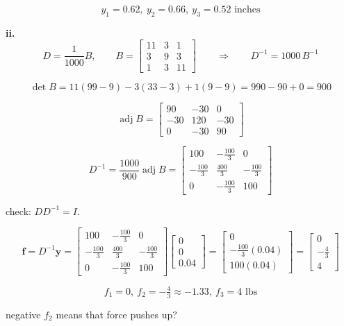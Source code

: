 \documentclass{article}
\begin{document}
\[
\boxed{y_1 = 0.62,\ y_2 = 0.66,\ y_3 = 0.52 \text{ inches}}
\]

\textbf{ii.}
\[
D = \frac{1}{1000}B,
\qquad
B =
\begin{bmatrix}
11 & 3 & 1 \\
3 & 9 & 3 \\
1 & 3 & 11
\end{bmatrix}
\qquad\Rightarrow\qquad
D^{-1} = 1000\,B^{-1}
\]

\[
\det B = 11(99 - 9) - 3(33 - 3) + 1(9 - 9) = 990 - 90 + 0 = 900
\]

\[
\operatorname{adj} B =
\begin{bmatrix}
90 & -30 & 0 \\
-30 & 120 & -30 \\
0 & -30 & 90
\end{bmatrix}
\]

\[
D^{-1} = \frac{1000}{900}\operatorname{adj} B =
\begin{bmatrix}
100 & -\tfrac{100}{3} & 0 \\[2pt]
-\tfrac{100}{3} & \tfrac{400}{3} & -\tfrac{100}{3} \\[2pt]
0 & -\tfrac{100}{3} & 100
\end{bmatrix}
\]

check: $DD^{-1} = I$. \checkmark

\[
\mathbf{f} = D^{-1}\mathbf{y} =
\begin{bmatrix}
100 & -\tfrac{100}{3} & 0 \\[2pt]
-\tfrac{100}{3} & \tfrac{400}{3} & -\tfrac{100}{3} \\[2pt]
0 & -\tfrac{100}{3} & 100
\end{bmatrix}
\begin{bmatrix}
0 \\ 0 \\ 0.04
\end{bmatrix}
=
\begin{bmatrix}
0 \\[2pt] -\tfrac{100}{3}(0.04) \\[2pt] 100(0.04)
\end{bmatrix}
=
\begin{bmatrix}
0 \\[2pt] -\tfrac{4}{3} \\[2pt] 4
\end{bmatrix}
\]

\[
\boxed{f_1 = 0,\ f_2 = -\tfrac{4}{3} \approx -1.33,\ f_3 = 4 \text{ lbs}}
\]

negative $f_2$ means that force pushes up?
\end{document}
